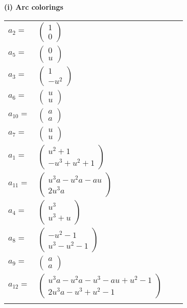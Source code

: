 \documentclass[1p]{elsarticle_modified}
\theoremstyle{definition}
\begin{document}
\flushleft \textbf{(i) Arc colorings}\\
\begin{tabular}{m{7pt} m{180pt} m{7pt} m{180pt} }
\flushright $a_{2}=$&$\begin{pmatrix}1\\0\end{pmatrix}$ \\
\flushright $a_{5}=$&$\begin{pmatrix}0\\u\end{pmatrix}$ \\
\flushright $a_{3}=$&$\begin{pmatrix}1\\- u^2\end{pmatrix}$ \\
\flushright $a_{6}=$&$\begin{pmatrix}u\\u\end{pmatrix}$ \\
\flushright $a_{10}=$&$\begin{pmatrix}a\\a\end{pmatrix}$ \\
\flushright $a_{7}=$&$\begin{pmatrix}u\\u\end{pmatrix}$ \\
\flushright $a_{1}=$&$\begin{pmatrix}u^2+1\\- u^3+u^2+1\end{pmatrix}$ \\
\flushright $a_{11}=$&$\begin{pmatrix}u^3 a- u^2 a- a u\\2 u^3 a\end{pmatrix}$ \\
\flushright $a_{4}=$&$\begin{pmatrix}u^3\\u^3+u\end{pmatrix}$ \\
\flushright $a_{8}=$&$\begin{pmatrix}- u^2-1\\u^3- u^2-1\end{pmatrix}$ \\
\flushright $a_{9}=$&$\begin{pmatrix}a\\a\end{pmatrix}$ \\
\flushright $a_{12}=$&$\begin{pmatrix}u^3 a- u^2 a- u^3- a u+u^2-1\\2 u^3 a- u^3+u^2-1\end{pmatrix}$\\&\end{tabular}
\end{document}
